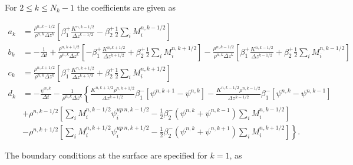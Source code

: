 \documentclass[dvipdfmx,a4paper,10pt]{article}
\begin{document}
\noindent For $2\leq k \leq N_k-1$ the coefficients are given as 

\begin{align*}
  a_k &=  \frac{\rho^{n,k-1/2}}{\rho^{n,k}\Delta z^k} \left[\beta_1^+ \frac{K^{n,k-1/2}}{\Delta z ^{k-1/2}}-\beta_2^+\frac{1}{2} \sum_iM_i^{n,k-1/2}\right]\\
    b_k &= -\frac{1}{\Delta t} + \frac{\rho^{n,k+1/2}}{\rho^{n,k}\Delta z^k} \left[-\beta_1^+\frac{K^{n,k+1/2}}{\Delta z ^{k+1/2}}+\beta_2^+\frac{1}{2}\sum_iM_i^{n,k+1/2} \right]-\frac{\rho^{n,k-1/2}}{\rho^{n,k}\Delta z^k} \left[\beta_1^+\frac{K^{n,k-1/2}}{\Delta z ^{k-1/2}}+\beta_2^+\frac{1}{2}\sum_iM_i^{n,k-1/2} \right] \\
      c_k &= \frac{\rho^{n,k+1/2}}{\rho^{n,k}\Delta z^k}\left[\beta_1^+ \frac{K^{n,k+1/2}}{\Delta z ^{k+1/2}}+\beta_2^+\frac{1}{2}\sum_iM_i^{n,k+1/2} \right] \\
      d_k &=-\frac{\psi^{n,k}}{\Delta t} - \frac{1}{\rho^{n,k}\Delta z^k} \left\{ \frac{K^{n,k+1/2}\rho^{n,k+1/2}}{\Delta z^{k+1/2}}\beta_1^{-}\left[\psi^{n,k+1} - \psi^{n,k}\right]-\frac{K^{n,k-1/2}\rho^{n,k-1/2}}{\Delta z^{k-1/2}}\beta_1^{-}\left[\psi^{n,k} - \psi^{n,k-1}\right]\right.   \\   
          & \left.+\rho^{n,k-1/2}\left[\sum_iM_i^{n,k-1/2}\psi_i^{up~n,k-1/2} - \frac{1}{2}\beta_2^{-}(\psi^{n,k}+\psi^{n,k-1})\sum_iM_i^{n,k-1/2} \right]\right.\\
          & \left. -\rho^{n,k+1/2}\left[\sum_iM_i^{n,k+1/2}\psi_i^{up~n,k+1/2} - \frac{1}{2}\beta_2^{-}(\psi^{n,k}+\psi^{n,k+1})\sum_iM_i^{n,k+1/2} \right] \right\}.
\end{align*}

\noindent The boundary conditions at the surface are specified for $k=1$, as
\end{document}
